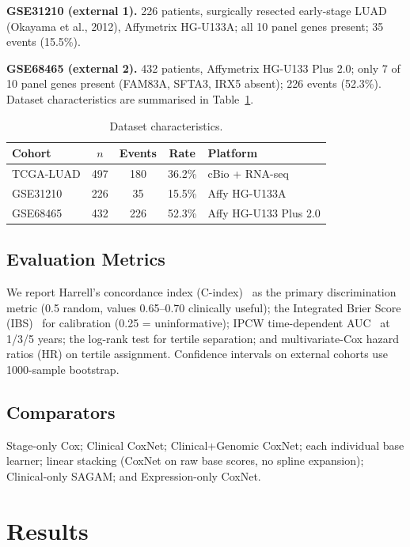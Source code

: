 \documentclass[journal]{IEEEtran}
\begin{document}
\textbf{GSE31210 (external 1).} 226 patients, surgically resected early-stage
LUAD (Okayama et al., 2012), Affymetrix HG-U133A; all 10 panel genes present;
35 events (15.5\%).

\textbf{GSE68465 (external 2).} 432 patients, Affymetrix HG-U133 Plus 2.0; only
7 of 10 panel genes present (FAM83A, SFTA3, IRX5 absent); 226 events (52.3\%).
Dataset characteristics are summarised in Table~\ref{tab:data}.

\begin{table}[!t]
\centering
\caption{Dataset characteristics.}
\label{tab:data}
\begin{tabular}{lcccl}
\toprule
\textbf{Cohort} & \textbf{$n$} & \textbf{Events} & \textbf{Rate} & \textbf{Platform}\\
\midrule
TCGA-LUAD     & 497 & 180 & 36.2\% & cBio + RNA-seq \\
GSE31210      & 226 & 35  & 15.5\% & Affy HG-U133A \\
GSE68465      & 432 & 226 & 52.3\% & Affy HG-U133 Plus 2.0 \\
\bottomrule
\end{tabular}
\end{table}

\subsection{Evaluation Metrics}
We report Harrell's concordance index (C-index)~\cite{harrell1982evaluating}
as the primary discrimination metric (0.5 random, values 0.65--0.70 clinically
useful); the Integrated Brier Score (IBS)~\cite{graf1999assessment} for
calibration (0.25 = uninformative); IPCW time-dependent
AUC~\cite{uno2007evaluating} at 1/3/5 years; the log-rank test for tertile
separation; and multivariate-Cox hazard ratios (HR) on tertile assignment.
Confidence intervals on external cohorts use 1000-sample bootstrap.

\subsection{Comparators}
Stage-only Cox; Clinical CoxNet; Clinical+Genomic CoxNet; each individual base
learner; linear stacking (CoxNet on raw base scores, no spline expansion);
Clinical-only SAGAM; and Expression-only CoxNet.

\section{Results}
\label{sec:results}
\end{document}
